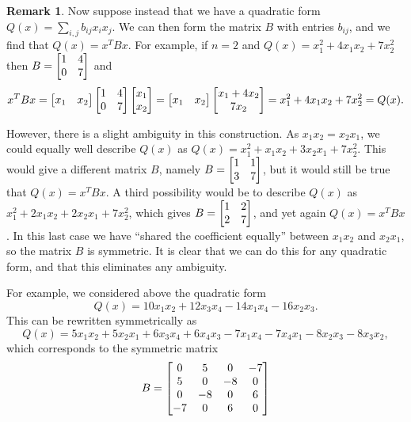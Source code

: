 \documentclass[reqno]{amsart}
\theoremstyle{definition}
\newtheorem{remark}[theorem]{Remark}
\begin{document}
\begin{remark}\label{rem-quadratic-symmetrise}
 Now suppose instead that we have a quadratic form
 $Q(x)=\sum_{i,j}b_{ij}x_ix_j$.  We can then form the matrix $B$ with
 entries $b_{ij}$, and we find that $Q(x)=x^TBx$.  For example, if
 $n=2$ and $Q(x)=x_1^2+4x_1x_2+7x_2^2$ then $B=\left[\begin{matrix} 1&4\\ 0&7\end{matrix}\right]$ and
 \[ x^TBx
    = \left[\begin{matrix} x_1&x_2\end{matrix}\right] \left[\begin{matrix} 1&4\\ 0&7\end{matrix}\right] \left[\begin{matrix} x_1\\ x_2\end{matrix}\right] 
    = \left[\begin{matrix} x_1&x_2\end{matrix}\right] \left[\begin{matrix} x_1+4x_2 \\ 7x_2 \end{matrix}\right] 
    = x_1^2 + 4x_1x_2 + 7x_2^2
    = Q(x).
 \]

 However, there is a slight ambiguity in this construction.  As
 $x_1x_2=x_2x_1$, we could equally well describe $Q(x)$ as 
 $Q(x)=x_1^2+x_1x_2+3x_2x_1+7x_2^2$.  This would give a different
 matrix $B$, namely $B=\left[\begin{matrix} 1&1\\ 3&7\end{matrix}\right]$, but it would still be true
 that $Q(x)=x^TBx$.  A third possibility would be to describe $Q(x)$
 as $x_1^2+2x_1x_2+2x_2x_1+7x_2^2$, which gives $B=\left[\begin{matrix} 1&2\\2&7\end{matrix}\right]$,
 and yet again $Q(x)=x^TBx$.  In this last case we have ``shared the
 coefficient equally'' between $x_1x_2$ and $x_2x_1$, so the matrix
 $B$ is symmetric.  It is clear that we can do this for any quadratic
 form, and that this eliminates any ambiguity.  

 For example, we considered above the quadratic form
 \[ Q(x)=10x_1x_2+12x_3x_4-14x_1x_4-16x_2x_3. \]
 This can be rewritten symmetrically as 
 \[ Q(x) = 
      5 x_1x_2 + 5 x_2x_1 
    + 6 x_3x_4 + 6 x_4x_3  
    - 7 x_1x_4 - 7 x_4x_1
    - 8 x_2x_3 - 8 x_3x_2,
 \]
 which corresponds to the symmetric matrix
 \[ B = \left[\begin{matrix}
     0 &  5 &  0 & -7 \\
     5 &  0 & -8 &  0 \\
     0 & -8 &  0 &  6 \\
    -7 &  0 &  6 &  0
    \end{matrix}\right]
 \]
\end{remark}
\end{document}

